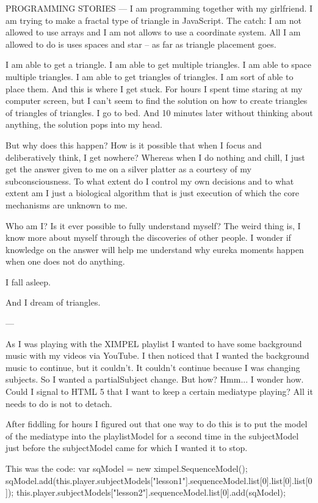 PROGRAMMING STORIES
---
I am programming together with my girlfriend. I am trying to make a fractal type of triangle in JavaScript. The catch: I am not allowed to use arrays and I am not allows to use a coordinate system. All I am allowed to do is uses spaces and star -- as far as triangle placement goes. 

I am able to get a triangle.
I am able to get multiple triangles.
I am able to space multiple triangles.
I am able to get triangles of triangles.
I am sort of able to place them.
And this is where I get stuck.
For hours I spent time staring at my computer screen, but I can't seem to find the solution on how to create triangles of triangles of triangles.
I go to bed.
And 10 minutes later without thinking about anything, the solution pops into my head.

But why does this happen? How is it possible that when I focus and deliberatively think, I get nowhere? Whereas when I do nothing and chill, I just get the answer given to me on a silver platter as a courtesy of my subconsciousness. To what extent do I control my own decisions and to what extent am I just a biological algorithm that is just execution of which the core mechanisms are unknown to me. 

Who am I? Is it ever possible to fully understand myself? The weird thing is, I know more about myself through the discoveries of other people. I wonder if knowledge on the answer will help me understand why eureka moments happen when one does not do anything.

I fall asleep.

And I dream of triangles.

---

As I was playing with the XIMPEL playlist I wanted to have some background music with my videos via YouTube. I then noticed that I wanted the background music to continue, but it couldn't. It couldn't continue because I was changing subjects. So I wanted a partialSubject change. But how? Hmm... I wonder how. Could I signal to HTML 5 that I want to keep a certain mediatype playing? All it needs to do is not to detach.

After fiddling for hours I figured out that one way to do this is to put the model of the mediatype into the playlistModel for a second time in the subjectModel just before the subjectModel came for which I wanted it to stop.

This was the code:
var sqModel = new ximpel.SequenceModel();
	sqModel.add(this.player.subjectModels["lesson1"].sequenceModel.list[0].list[0].list[0]);
	this.player.subjectModels["lesson2"].sequenceModel.list[0].add(sqModel);
	
